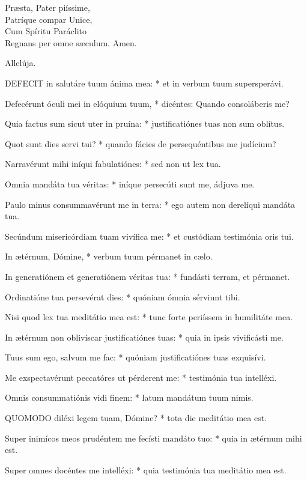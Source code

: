 Præsta, Pater piíssime,\\
Patríque compar Unice,\\
Cum Spíritu Paráclito\\
Regnans per omne sæculum. Amen.

 Allelúja.


\lettrine[lines=2]{D}{EFECIT} in salutáre tuum ánima mea: * et in verbum tuum supersperávi.

Defecérunt óculi mei in elóquium tuum, * dicéntes: Quando consoláberis me?

Quia factus sum sicut uter in pruína: * justificatiónes tuas non sum oblítus.

Quot sunt dies servi tui? * quando fácies de persequéntibus me judícium?

Narravérunt mihi iníqui fabulatiónes: * sed non ut lex tua.

Omnia mandáta tua véritas: * iníque persecúti sunt me, ádjuva me.

Paulo minus consummavérunt me in terra: * ego autem non derelíqui mandáta tua.

Secúndum misericórdiam tuam vivífica me: * et custódiam testimónia oris tui.

In ætérnum, Dómine, * verbum tuum pérmanet in cælo.

In generatiónem et generatiónem véritas tua: * fundásti terram, et pérmanet.

Ordinatióne tua persevérat dies: * quóniam ómnia sérviunt tibi.

Nisi quod lex tua meditátio mea est: * tunc forte periíssem in humilitáte mea.

In ætérnum non oblivíscar justificatiónes tuas: * quia in ipsis vivificásti me.

Tuus sum ego, salvum me fac: * quóniam justificatiónes tuas exquisívi.

Me exspectavérunt peccatóres ut pérderent me: * testimónia tua intelléxi.

Omnis consummatiónis vidi finem: * latum mandátum tuum nimis.


\lettrine[lines=2]{Q}{UOMODO} diléxi legem tuam, Dómine? * tota die meditátio mea est.

Super inimícos meos prudéntem me fecísti mandáto tuo: * quia in ætérnum mihi est.

Super omnes docéntes me intelléxi: * quia testimónia tua meditátio mea est.

